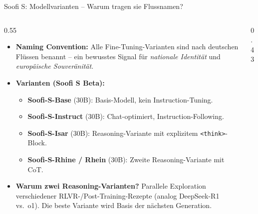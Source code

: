 \documentclass[aspectratio=1610, xcolor=dvipsnames, 9pt]{beamer}
\begin{document}
\begin{frame}{Soofi S: Modellvarianten -- Warum tragen sie Flussnamen?}
  \begin{columns}
    \begin{column}{0.55\textwidth}
      \begin{itemize}
        \item \textbf{Naming Convention:} Alle Fine-Tuning-Varianten sind nach deutschen Flüssen benannt -- ein bewusstes Signal für \emph{nationale Identität} und \emph{europäische Souveränität}.
        \vspace{0.2cm}
        \item \textbf{Varianten (Soofi S Beta):}
          \begin{itemize}\small
            \item \textbf{Soofi-S-Base} (30B): Basis-Modell, kein Instruction-Tuning.
            \item \textbf{Soofi-S-Instruct} (30B): Chat-optimiert, Instruction-Following.
            \item \textbf{Soofi-S-Isar} (30B): Reasoning-Variante mit explizitem \texttt{<think>}-Block.
            \item \textbf{Soofi-S-Rhine / Rhein} (30B): Zweite Reasoning-Variante mit CoT.
          \end{itemize}
        \item \textbf{Warum zwei Reasoning-Varianten?} Parallele Exploration verschiedener RLVR-/Post-Training-Rezepte (analog DeepSeek-R1 vs.\ o1). Die beste Variante wird Basis der nächsten Generation.
      \end{itemize}
    \end{column}
    \begin{column}{0.43\textwidth}
      \centering
\end{column}
\end{columns}
\end{frame}
\end{document}
